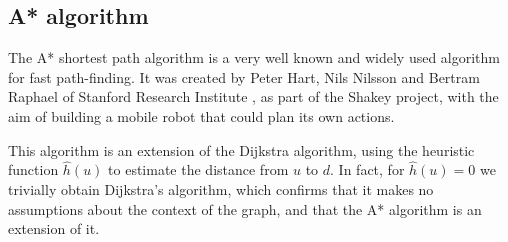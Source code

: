 \subsection{A* algorithm}
The A* shortest path algorithm is a very well known and widely used algorithm for fast path-finding. It was created by Peter Hart, Nils Nilsson and Bertram Raphael of Stanford Research Institute \cite{Astar}, as part of the Shakey project, with the aim of building a mobile robot that could plan its own actions.\par
This algorithm is an extension of the Dijkstra algorithm, using the heuristic function $\hat{h}(u)$ to estimate the distance from $u$ to $d$. In fact, for $\hat{h}(u) = 0$ we trivially obtain Dijkstra's algorithm, which confirms that it makes no assumptions about the context of the graph, and that the A* algorithm is an extension of it.
